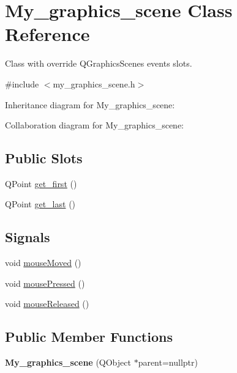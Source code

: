 \hypertarget{classMy__graphics__scene}{}\section{My\+\_\+graphics\+\_\+scene Class Reference}
\label{classMy__graphics__scene}


Class with override Q\+Graphics\+Scene\textquotesingle{}s events slots.  




{\ttfamily \#include $<$my\+\_\+graphics\+\_\+scene.\+h$>$}



Inheritance diagram for My\+\_\+graphics\+\_\+scene\+:


Collaboration diagram for My\+\_\+graphics\+\_\+scene\+:
\subsection*{Public Slots}
\begin{DoxyCompactItemize}
\item 
Q\+Point \hyperlink{classMy__graphics__scene_a5553f3045e6b1fad620beade1bb3826b}{get\+\_\+first} ()
\item 
Q\+Point \hyperlink{classMy__graphics__scene_a96c3f9ee9e6eddb9274009fe6ca0efdb}{get\+\_\+last} ()
\end{DoxyCompactItemize}
\subsection*{Signals}
\begin{DoxyCompactItemize}
\item 
void \hyperlink{classMy__graphics__scene_a19a366fc2641b81457f8bf0e93975727}{mouse\+Moved} ()
\item 
void \hyperlink{classMy__graphics__scene_ac4315850eda3e2cbd0149799028a444b}{mouse\+Pressed} ()
\item 
void \hyperlink{classMy__graphics__scene_a3bfdd81b3bfb25057db5b78f776d3442}{mouse\+Released} ()
\end{DoxyCompactItemize}
\subsection*{Public Member Functions}
\begin{DoxyCompactItemize}
\item 
{\bfseries My\+\_\+graphics\+\_\+scene} (Q\+Object $\ast$parent=nullptr)\hypertarget{classMy__graphics__scene_ab674772e3ccb1732d9f9181ddc287a89}{}\label{classMy__graphics__scene_ab674772e3ccb1732d9f9181ddc287a89}

\end{DoxyCompactItemize}


